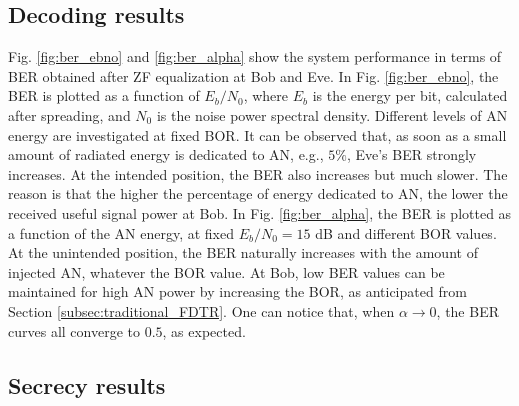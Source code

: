 \documentclass[conference]{IEEEtran}
\begin{document}
\subsection{Decoding results}
Fig. \ref{fig:ber_ebno} and \ref{fig:ber_alpha} show the system performance in terms of BER obtained after ZF equalization at Bob and Eve. In Fig. \ref{fig:ber_ebno}, the BER is plotted as a function of $E_b/N_0$, where $E_b$ is the energy per bit, calculated after spreading, and $N_0$ is the noise power spectral density.  Different levels of AN energy are investigated at fixed BOR. It can be observed that, as soon as a small amount of radiated energy is dedicated to AN, e.g., $5\%$, Eve's BER strongly increases. At the intended position, the BER also increases but much slower. The reason is that the higher the percentage of energy dedicated to AN, the lower the received useful signal power at Bob. In Fig. \ref{fig:ber_alpha}, the BER is plotted as a function of the AN energy, at fixed $E_b/N_0=15$ dB and different BOR values. At the unintended position, the BER naturally increases with the amount of injected AN, whatever the BOR value. At Bob, low BER values can be maintained for high AN power by increasing the BOR, as anticipated from Section \ref{subsec:traditional_FDTR}. One can notice that, when $\alpha \to 0$, the BER curves all converge to $0.5$, as expected.




\subsection{Secrecy results}
\end{document}
